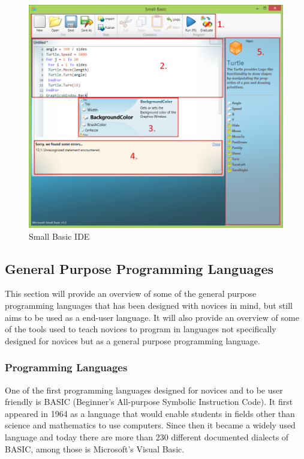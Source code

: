 \begin{figure}[H]
\begin{center}
\includegraphics[scale=0.60]{./pics/SmallBasic.png}
\caption{Small Basic IDE}
\label{fig:small_basic_ide}
\end{center}
\end{figure}

\subsection{General Purpose Programming Languages}
This section will provide an overview of some of the general purpose programming languages that has been designed with novices in mind, but still aims to be used as a end-user language. It will also provide an overview of some of the tools used to teach novices to program in languages not specifically designed for novices but as a general purpose programming language.

\subsubsection{Programming Languages}
One of the first programming languages designed for novices and to be user friendly is BASIC (Beginner's All-purpose Symbolic Instruction Code). It first appeared in 1964 as a language that would enable students in fields other than science and mathematics to use computers. Since then it became a widely used language and today there are more than 230 different documented dialects of BASIC, among those is Microsoft's Visual Basic.

